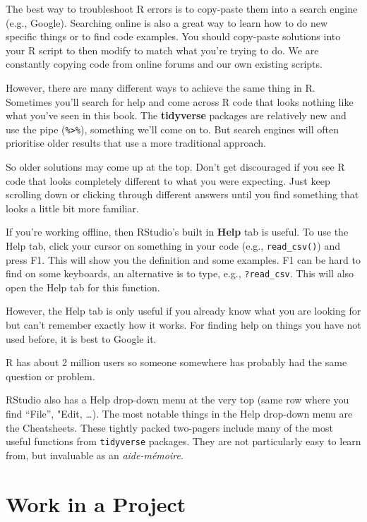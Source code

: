 \documentclass[
  12pt,
  krantz2]{krantz}
\begin{document}

The best way to troubleshoot R errors is to copy-paste them into a search engine (e.g., Google).
Searching online is also a great way to learn how to do new specific things or to find code examples.
You should copy-paste solutions into your R script to then modify to match what you're trying to do.
We are constantly copying code from online forums and our own existing scripts.

However, there are many different ways to achieve the same thing in R.
Sometimes you'll search for help and come across R code that looks nothing like what you've seen in this book.
The \textbf{tidyverse} packages are relatively new and use the pipe (\texttt{\%\textgreater{}\%}), something we'll come on to.
But search engines will often prioritise older results that use a more traditional approach.

So older solutions may come up at the top.
Don't get discouraged if you see R code that looks completely different to what you were expecting.
Just keep scrolling down or clicking through different answers until you find something that looks a little bit more familiar.

If you're working offline, then RStudio's built in \textbf{Help} tab is useful.
To use the Help tab, click your cursor on something in your code (e.g., \texttt{read\_csv()}) and press F1.
This will show you the definition and some examples.
F1 can be hard to find on some keyboards, an alternative is to type, e.g., \texttt{?read\_csv}.
This will also open the Help tab for this function.

However, the Help tab is only useful if you already know what you are looking for but can't remember exactly how it works.
For finding help on things you have not used before, it is best to Google it.

R has about 2 million users so someone somewhere has probably had the same question or problem.

RStudio also has a Help drop-down menu at the very top (same row where you find ``File'', "Edit, \ldots).
The most notable things in the Help drop-down menu are the Cheatsheets.
These tightly packed two-pagers include many of the most useful functions from \texttt{tidyverse} packages.
They are not particularly easy to learn from, but invaluable as an \emph{aide-mémoire}.

\hypertarget{work-in-a-project}{%
\section{Work in a Project}\label{work-in-a-project}}
\end{document}
